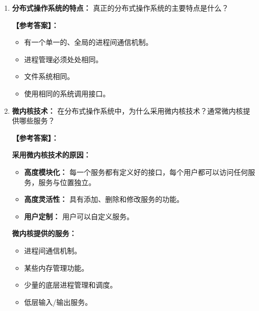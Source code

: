 \documentclass[a4paper,12pt]{article}
\newcommand{\answer}[1]{\par\vspace{0.5em}\hspace{2em}\textbf{【参考答案】：}\\{\color{blue}#1}\par\vspace{1em}}
\begin{document}
\begin{enumerate}[label=\arabic*.]
    \answer{
    \textbf{本质区别：} 多处理机系统是共享存储器的计算机系统，多计算机系统是不共享存储器的计算机系统。
    
    \textbf{详细说明：}
    \begin{itemize}
        \item \textbf{多处理机系统：} 所有 CPU 共享统一的虚拟地址空间，分为基于总线和基于交换两种。
            \begin{itemize}
                \item 基于总线：多个 CPU 连接到一条公共总线和一个存储器模块。
                \item 基于交换：存储器划分为多个模块，通过纵横式交换器连接。
            \end{itemize}
        \item \textbf{多计算机系统：} 每个计算机有它自己的存储器，分为基于总线和基于交换两种。
            \begin{itemize}
                \item 基于总线：每个 CPU 与自身存储器直接相连，通过共享网络彼此相连。
                \item 基于交换：处理器之间消息通过互联网进行路由。
            \end{itemize}
    \end{itemize}
    }

    \item \textbf{分布式操作系统的特点：}
    真正的分布式操作系统的主要特点是什么？
    
    \answer{
    \begin{itemize}
        \item 有一个单一的、全局的进程间通信机制。
        \item 进程管理必须处处相同。
        \item 文件系统相同。
        \item 使用相同的系统调用接口。
    \end{itemize}
    }

    \item \textbf{微内核技术：}
    在分布式操作系统中，为什么采用微内核技术？通常微内核提供哪些服务？
    
    \answer{
    \textbf{采用微内核技术的原因：}
    \begin{itemize}
        \item \textbf{高度模块化：} 每一个服务都有定义好的接口，每个用户都可以访问任何服务，服务与位置独立。
        \item \textbf{高度灵活性：} 具有添加、删除和修改服务的功能。
        \item \textbf{用户定制：} 用户可以自定义服务。
    \end{itemize}
    
    \textbf{微内核提供的服务：}
    \begin{itemize}
        \item 进程间通信机制。
        \item 某些内存管理功能。
        \item 少量的底层进程管理和调度。
        \item 低层输入/输出服务。
    \end{itemize}
    }
\end{enumerate}
\end{document}
